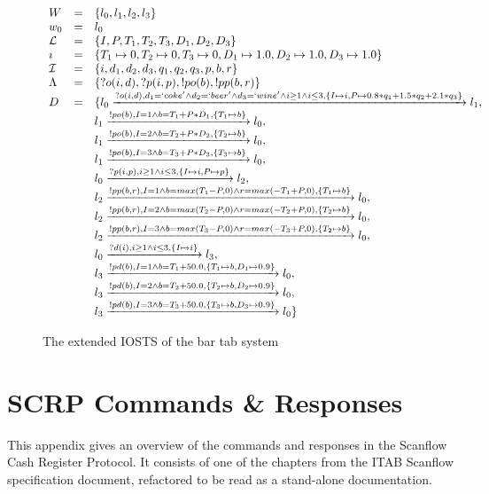   \begin{figure}[ht]
    \begin{center}
      $\begin{array}{lcl}
      W & = & \{l_0, l_1, l_2, l_3\} \\
      w_0 & = & l_0 \\
      \mathcal{L} & = & \{I, P, T_1, T_2, T_3, D_1, D_2, D_3\} \\
      \imath & = & \{T_1 \mapsto 0, T_2 \mapsto 0, T_3 \mapsto 0, D_1 \mapsto 1.0, D_2 \mapsto 1.0, D_3 \mapsto 1.0\} \\
      \mathcal{I} & = & \{i, d_1, d_2, d_3, q_1, q_2, q_3, p, b, r\} \\
      \Lambda & = & \{?o(i,d), ?p(i,p), !po(b), !pp(b, r)\} \\
      D & = & \{l_0\xrightarrow{?o(i,d), d_1=`coke' \land d_2=`beer' \land d_3=`wine' \land i \geq 1 \land i \leq 3, \{I \mapsto i, P \mapsto 0.8*q_1+1.5*q_2+2.1*q_3\}}l_1, \\
      & & l_1\xrightarrow{!po(b), I=1\land b=T_1+P*D_1, \{T_1 \mapsto b\}}l_0,\\
      & & l_1\xrightarrow{!po(b), I=2\land b=T_2+P*D_2, \{T_2 \mapsto b\}}l_0,\\
      & & l_1\xrightarrow{!po(b), I=3\land b=T_3+P*D_3, \{T_3 \mapsto b\}}l_0,\\
      & & l_0\xrightarrow{?p(i,p), i \geq 1 \land i \leq 3, \{I \mapsto i, P \mapsto p\}}l_2,\\
      & & l_2\xrightarrow{!pp(b,r),I=1\land b=max(T_1-P, 0)\land r=max(-T_1+P,0),\{T_1 \mapsto b\}}l_0,\\
      & & l_2\xrightarrow{!pp(b,r),I=2\land b=max(T_2-P, 0)\land r=max(-T_2+P,0),\{T_2 \mapsto b\}}l_0, \\
      & & l_2\xrightarrow{!pp(b,r),I=3\land b=max(T_3-P, 0)\land r=max(-T_3+P,0),\{T_2 \mapsto b\}}l_0, \\
      & & l_0\xrightarrow{?d(i), i \geq 1 \land i \leq 3,\{I \mapsto i\}}l_3, \\
      & & l_3\xrightarrow{!pd(b), I=1\land b=T_1+50.0, \{T_1 \mapsto b, D_1 \mapsto 0.9\}}l_0, \\
      & & l_3\xrightarrow{!pd(b), I=2\land b=T_2+50.0, \{T_2 \mapsto b, D_2 \mapsto 0.9\}}l_0, \\
      & & l_3\xrightarrow{!pd(b), I=3\land b=T_3+50.0, \{T_3 \mapsto b, D_3 \mapsto 0.9\}}l_0 \}
      \end{array}$
    \end{center}
    \caption{The extended IOSTS of the bar tab system}
    \label{fig:sts-bartab-extended}
  \end{figure}

  \newpage
  \chapter{SCRP Commands \& Responses}\label{app:scrp-specification}
  This appendix gives an overview of the commands and responses in the Scanflow Cash Register Protocol. It consists of one of the chapters from the ITAB Scanflow specification document, refactored to be read as a stand-alone documentation.
  